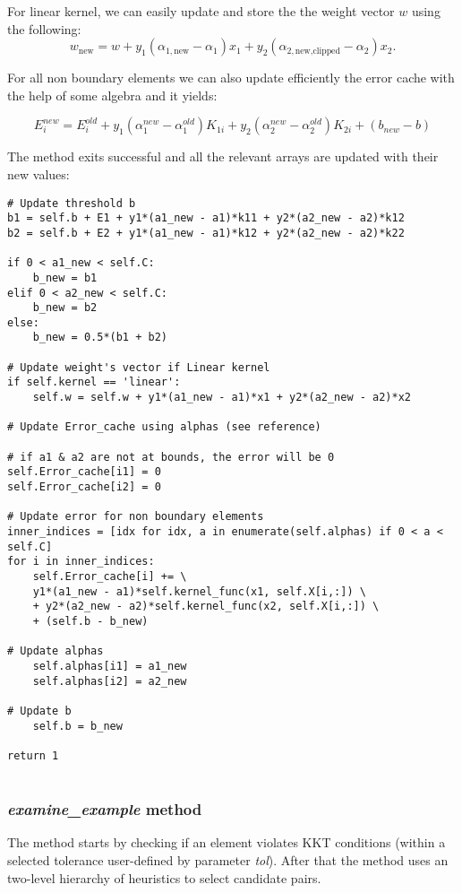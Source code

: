 \documentclass[10pt,a4paper]{article}
\newcounter{para}
\begin{document}
For linear kernel, we can easily update and store the the weight vector \( w \) using the following:
\[
w_{\text{new}} = w + y_1 (\alpha_{1,\text{new}} - \alpha_1) x_1 + y_2 (\alpha_{2,\text{new,clipped}} - \alpha_2) x_2.
\]

For all non boundary elements we can also update efficiently the error cache with the help of some algebra and it yields:

\[
E^{new}_i = E^{old}_i + y_1 (\alpha^{new}_1 -
\alpha^{old}_1) K_{1i} + y_2 (\alpha^{new}_2 - \alpha^{old}_2) K_{2i} +
(b_{new} - b)\]

The method exits successful and all the relevant arrays are updated with their new values:

\begin{lstlisting}
# Update threshold b
b1 = self.b + E1 + y1*(a1_new - a1)*k11 + y2*(a2_new - a2)*k12
b2 = self.b + E2 + y1*(a1_new - a1)*k12 + y2*(a2_new - a2)*k22
	
if 0 < a1_new < self.C:
	b_new = b1
elif 0 < a2_new < self.C:
	b_new = b2
else:
	b_new = 0.5*(b1 + b2)
	
# Update weight's vector if Linear kernel
if self.kernel == 'linear':
	self.w = self.w + y1*(a1_new - a1)*x1 + y2*(a2_new - a2)*x2
	
# Update Error_cache using alphas (see reference)
	
# if a1 & a2 are not at bounds, the error will be 0
self.Error_cache[i1] = 0
self.Error_cache[i2] = 0
	
# Update error for non boundary elements
inner_indices = [idx for idx, a in enumerate(self.alphas) if 0 < a < self.C]
for i in inner_indices:
	self.Error_cache[i] += \
	y1*(a1_new - a1)*self.kernel_func(x1, self.X[i,:]) \
	+ y2*(a2_new - a2)*self.kernel_func(x2, self.X[i,:]) \
	+ (self.b - b_new)
	
# Update alphas
	self.alphas[i1] = a1_new
	self.alphas[i2] = a2_new
	
# Update b
	self.b = b_new
	
return 1
	
\end{lstlisting}

\subsubsection{\textit{examine\_example} method}

The method starts by checking if an element violates KKT conditions (within a selected tolerance user-defined by parameter \textit{tol}). After that the method uses an two-level hierarchy of heuristics to select candidate pairs.
\end{document}
